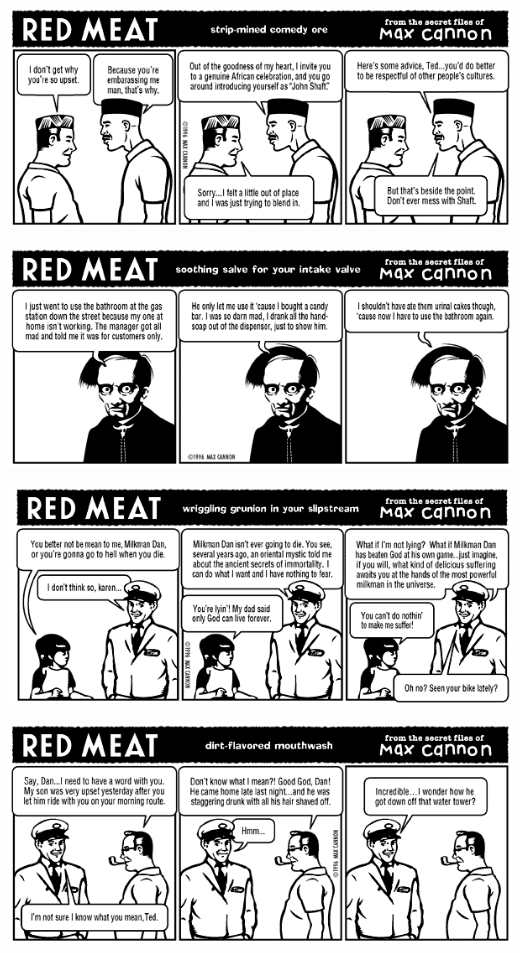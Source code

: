 \documentclass[a4paper,twoside,11pt]{article}
\begin{document}
\includegraphics[width=\textwidth]{redmeat_1997-02-17.png}



\includegraphics[width=\textwidth]{redmeat_1997-02-24.png}



\includegraphics[width=\textwidth]{redmeat_1997-03-03.png}



\includegraphics[width=\textwidth]{redmeat_1997-03-10.png}
\end{document}
